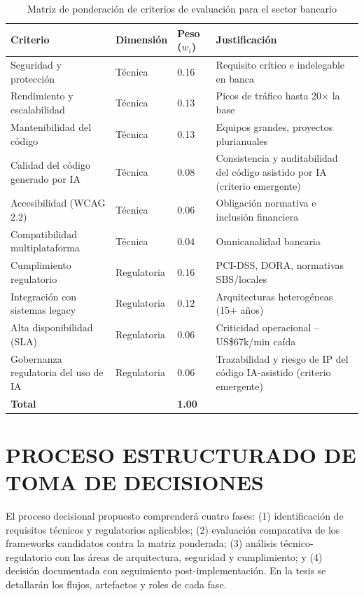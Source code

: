\begin{table}[htbp]
\centering
\caption{Matriz de ponderación de criterios de evaluación para el sector bancario}
\label{tab:4.1}
\small
\begin{tabular}{@{}p{4.6cm}p{2cm}p{1.3cm}p{5cm}@{}}
\toprule
Criterio & Dimensión & Peso ($w_i$) & Justificación \\
\midrule
Seguridad y protección              & Técnica     & 0.16 & Requisito crítico e indelegable en banca \\
Rendimiento y escalabilidad         & Técnica     & 0.13 & Picos de tráfico hasta 20$\times$ la base \\
Mantenibilidad del código           & Técnica     & 0.13 & Equipos grandes, proyectos plurianuales \\
Calidad del código generado por IA  & Técnica     & 0.08 & Consistencia y auditabilidad del código asistido por IA (criterio emergente) \\
Accesibilidad (WCAG 2.2)            & Técnica     & 0.06 & Obligación normativa e inclusión financiera \\
Compatibilidad multiplataforma      & Técnica     & 0.04 & Omnicanalidad bancaria \\
Cumplimiento regulatorio            & Regulatoria & 0.16 & PCI-DSS, DORA, normativas SBS/locales \\
Integración con sistemas legacy     & Regulatoria & 0.12 & Arquitecturas heterogéneas (15+ años) \\
Alta disponibilidad (SLA)           & Regulatoria & 0.06 & Criticidad operacional -- US\$67k/min caída \\
Gobernanza regulatoria del uso de IA & Regulatoria & 0.06 & Trazabilidad y riesgo de IP del código IA-asistido (criterio emergente) \\
\midrule
\textbf{Total} & & \textbf{1.00} & \\
\bottomrule
\end{tabular}
\end{table}

\section{PROCESO ESTRUCTURADO DE TOMA DE DECISIONES}

El proceso decisional propuesto comprenderá cuatro fases: (1) identificación
de requisitos técnicos y regulatorios aplicables; (2) evaluación comparativa
de los frameworks candidatos contra la matriz ponderada; (3) análisis
técnico-regulatorio con las áreas de arquitectura, seguridad y cumplimiento;
y (4) decisión documentada con seguimiento post-implementación. En la tesis
se detallarán los flujos, artefactos y roles de cada fase.

